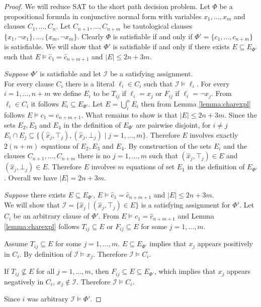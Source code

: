 \begin{proof}

We will reduce SAT to the short path decision problem.
Let $\Phi$ be a propositional formula in conjunctive normal form with variables $x_1,\ldots,x_m$ and clauses $C_1,\ldots,C_n$.
Let $C_{n+1},\ldots,C_{n+m}$ be tautological clauses $\{x_1, \neg x_1\},\ldots,\{x_m,\neg x_m\}$.
Clearly $\Phi$ is satisfiable if and only if $\Phi' = \{c_1,\ldots,c_{n+m}\}$ is satisfiable.
We will show that $\Phi'$ is satisfiable if and only if there exists $E \subseteq E_{\Phi'}$ such that $E \models \hat{c}_1 = \hat{c}_{n+m+1}$ and $|E| \leq 2n + 3m$.

\emph{Suppose} $\Phi'$ is satisfiable and let $\mathcal{I}$ be a satisfying assignment.\\
For every clause $C_i$ there is a literal $\ell_i \in C_i$ such that $\mathcal{I} \models \ell_i$.
For every $i = 1,\ldots,n+m$ we define $E_i$ to be $T_{ij}$ if $\ell_i = x_j$ or $F_{ij}$ if $\ell_i = \neg x_j$.
From $\ell_i \in C_i$ it follows $E_i \subseteq E_{\Phi'}$.
Let $E = \bigcup_i^n E_i$ then from Lemma \ref{lemma:charexpl} follows $E \models c_1 = c_{n+m+1}$.
What remains to show is that $|E| \leq 2n + 3m$.
Since the sets $E_2, E_3$ and $E_4$ in the definition of $E_{\Phi'}$ are pairwise disjoint, for $i \neq j$ $E_i \cap E_j \subseteq \{(\hat{x}_j,\top_j),(\hat{x}_j,\bot_j) \mid j = 1,\ldots,m\}$.
Therefore $E$ involves exactly $2(n+m)$ equations of $E_2, E_3$ and $E_4$.
By construction of the sets $E_i$ and the clauses $C_{n+1},\ldots,C_{n+m}$ there is no $j = 1,\ldots,m$ such that $(\hat{x}_j,\top_j) \in E$ and $(\hat{x}_j,\bot_j) \in E$.
Therefore $E$ involves $m$ equations of set $E_1$ in the definition of $E_{\Phi'}$.
Overall we have $|E| = 2n + 3m$.

\emph{Suppose} there exists $E \subseteq E_{\Phi'}$, $E \models \hat{c}_1 = \hat{c}_{n+m+1}$ and $|E| \leq 2n + 3m$.\\
We will show that $\mathcal{I} = \{\hat{x}_j \mid (\hat{x}_j,\top_j) \in E\}$ is a satisfying assignment for $\Phi'$.
Let $C_i$ be an arbitrary clause of $\Phi'$.
From $E \models \hat{c}_1 = \hat{c}_{n+m+1}$ and Lemma \ref{lemma:charexpl} follows $T_{ij} \subseteq E$ or $F_{ij} \subseteq E$ for some $j=1,\ldots,m$.

\noindent Assume $T_{ij} \subseteq E$ for some $j = 1,\ldots,m$.
$E \subseteq E_{\Phi'}$ implies that $x_j$ appears positively in $C_i$. 
By definition of $\mathcal{I} \models x_j$. Therefore $\mathcal{I} \models C_i$.

\noindent If $T_{ij} \nsubseteq E$ for all $j = 1,\ldots,m$, then $F_{ij} \subseteq E \subseteq E_{\Phi'}$, which implies that $x_j$ appears negatively in $C_i$, $x_j \notin \mathcal{I}$. Therefore $\mathcal{I} \models C_i$.

\noindent Since $i$ was arbitrary $\mathcal{I} \models \Phi'$.

\end{proof}


